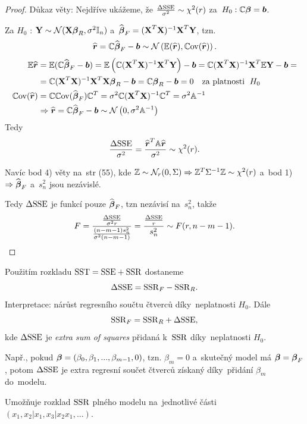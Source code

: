 \begin{proof}
Důkaz věty: Nejdříve ukážeme, že $\frac{\Delta \mathrm{SSE}}{\sigma^2} \sim \chi^2 (r)$ za~$H_0: \mathbb{C}\boldsymbol{\beta} = \boldsymbol{b}$.

Za $H_0$ : $\textbf{Y} \sim \mathcal{N}(\textbf{X} \boldsymbol{\beta}_R, \sigma^2 \mathbb{I}_{n})$ a~$\widehat{\boldsymbol{\beta}}_F = (\textbf{X}^T \textbf{X})^{-1} \textbf{X}^T \textbf{Y}$, tzn.
 $$
\widehat{\boldsymbol{r}} = \mathbb{C} \widehat{\boldsymbol{\beta}}_F - \boldsymbol{b} \sim \mathcal{N}\left(\mathbb{E}(\widehat{\boldsymbol{r}}), \mathbb{C}\mathrm{ov}(\widehat{\boldsymbol{r}}) \right).
 $$
\begin{align*}
\mathbb{E} \widehat{\boldsymbol{r}} & = \mathbb{E} (\mathbb{C} \widehat{\boldsymbol{\beta}}_F - \boldsymbol{b}) = \mathbb{E} \left(\mathbb{C} (\textbf{X}^T \textbf{X})^{-1} \textbf{X}^T \textbf{Y} \right) - \boldsymbol{b} = \mathbb{C} (\textbf{X}^T \textbf{X})^{-1} \textbf{X}^T \mathbb{E} \textbf{Y} - \boldsymbol{b} = \\
& = \mathbb{C} (\textbf{X}^T \textbf{X})^{-1} \textbf{X}^T \textbf{X} \boldsymbol{\beta}_R - \boldsymbol{b} = \mathbb{C} \boldsymbol{\beta}_R - \boldsymbol{b} = 0 \quad \text{za platnosti \;} H_0 \\
\mathbb{C}\mathrm{ov}(\widehat{\boldsymbol{r}}) & = \mathbb{C} \mathbb{C}\mathrm{ov}(\widehat{\boldsymbol{\beta}}_F) \mathbb{C}^T = \sigma^2 \mathbb{C} (\textbf{X}^T \textbf{X})^{-1} \mathbb{C}^T = \sigma^2 \mathbb{A}^{-1} \\
& \Rightarrow \widehat{\boldsymbol{r}} = \mathbb{C} \widehat{\boldsymbol{\beta}}_F - \boldsymbol{b} \sim \mathcal{N} \left(0, \sigma^2 \mathbb{A}^{-1} \right)
\end{align*}
Tedy
 $$
\frac{\Delta \mathrm{SSE}}{\sigma^2} = \frac{\widehat{\boldsymbol{r}}^T \mathbb{A} \widehat{\boldsymbol{r}}}{\sigma^2} \sim \chi^2(r).
 $$

Navíc bod 4) věty na~str (55), kde $\mathbb{Z} \sim \mathcal{N}_r(0, \Sigma) \Rightarrow \mathbb{Z}^T \Sigma^{-1} \mathbb{Z} \sim \chi^2(r)$ a~bod 1) $\Rightarrow \widehat{\boldsymbol{\beta}}_F$ a~$s_n^2$ jsou nezávislé.

Tedy $\Delta \mathrm{SSE}$ je funkcí pouze $\widehat{\boldsymbol{\beta}}_F$, tzn nezávisí na~$s_n^2$, takže
 $$
F = \frac{\frac{\Delta \mathrm{SSE}}{\sigma^2 r}}{\frac{(n-m-1)s_n^2}{\sigma^2(n-m-1)}} = \frac{\frac{\Delta \mathrm{SSE}}{r}}{s_n^2} \sim F(r, n-m-1).
 $$
\end{proof}

\begin{remark}
Použitím rozkladu $\mathrm{SST} = \mathrm{SSE} + \mathrm{SSR}$ dostaneme
 $$
\Delta \mathrm{SSE} = \mathrm{SSR}_F - \mathrm{SSR}_R.
 $$
Interpretace: nárůst regresního součtu čtverců díky~neplatnosti $H_0$. Dále
 $$
\mathrm{SSR}_F = \mathrm{SSR}_R + \Delta \mathrm{SSE},
 $$
kde $\Delta \mathrm{SSE}$ je \textit{extra sum of squares} přidaná k~$\mathrm{SSR}$ díky~neplatnosti $H_0$.

Např., pokud $\boldsymbol{\beta} = (\beta_0, \beta_1,..., \beta_{m-1}, 0)$, tzn. $\beta_m = 0$ a~skutečný model má $\boldsymbol{\beta} = \boldsymbol{\beta}_F$, potom $\Delta \mathrm{SSE}$ je extra regresní součet čtverců získaný díky~přidání $\beta_m$ do~modelu.

Umožňuje rozklad $\mathrm{SSR}$ plného modelu na~jednotlivé části $\left(x_1, x_2 | x_1, x_3 | x_2 x_1,... \right)$.
\end{remark}

